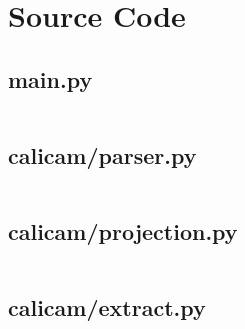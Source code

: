 \section{Source Code}

\subsection*{main.py}
\inputminted{python}{./calicam/main.py}

\subsection*{calicam/parser.py}
\inputminted{python}{./calicam/calicam/parser.py}

\subsection*{calicam/projection.py}
\inputminted{python}{./calicam/calicam/projection.py}

\subsection*{calicam/extract.py}
\inputminted{python}{./calicam/calicam/extract.py}
